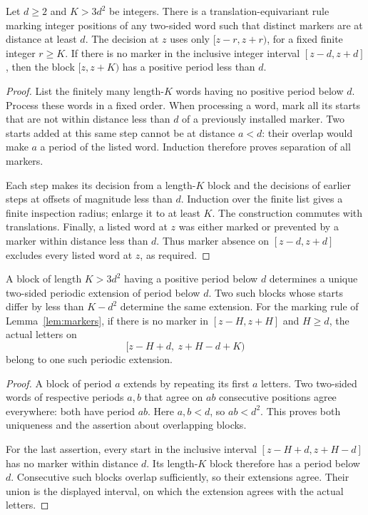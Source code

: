 \begin{lemma}\label{lem:markers}
Let $d\geq 2$ and $K>3d^2$ be integers.  There is a
translation-equivariant rule marking integer positions of any two-sided
word such that distinct markers are at distance at least $d$.
The decision at $z$ uses only $[z-r,z+r)$, for a fixed finite integer
$r\geq K$.  If there is no marker in the inclusive integer interval
$[z-d,z+d]$, then the block $[z,z+K)$ has a positive period less than $d$.
\end{lemma}

\begin{proof}
List the finitely many length-$K$ words having no positive period below
$d$.  Process these words in a fixed order.  When processing a word,
mark all its starts that are not within distance less than $d$ of a
previously installed marker.  Two starts added at this same step cannot
be at distance $a<d$: their overlap would make $a$ a period of the
listed word.  Induction therefore proves separation of all markers.

Each step makes its decision from a length-$K$ block and the decisions
of earlier steps at offsets of magnitude less than $d$.  Induction over
the finite list gives a finite inspection radius; enlarge it to at
least $K$.  The construction commutes with translations.  Finally, a
listed word at $z$ was either marked or prevented by a marker within
distance less than $d$.  Thus marker absence on $[z-d,z+d]$ excludes
every listed word at $z$, as required.
\end{proof}

\begin{lemma}\label{lem:periodic-extension}
A block of length $K>3d^2$ having a positive period below $d$ determines
a unique two-sided periodic extension of period below $d$.  Two such
blocks whose starts differ by less than $K-d^2$ determine the same
extension.  For the marking rule of Lemma~\ref{lem:markers}, if there is
no marker in $[z-H,z+H]$ and $H\geq d$, the actual letters on
\[
       [z-H+d,\ z+H-d+K)
\]
belong to one such periodic extension.
\end{lemma}

\begin{proof}
A block of period $a$ extends by repeating its first $a$ letters.  Two
two-sided words of respective periods $a,b$ that agree on $ab$
consecutive positions agree everywhere: both have period $ab$.
Here $a,b<d$, so $ab<d^2$.  This proves both uniqueness and the assertion
about overlapping blocks.

For the last assertion, every start in the inclusive interval
$[z-H+d,z+H-d]$ has no marker within distance $d$.  Its length-$K$ block
therefore has a period below $d$.  Consecutive such blocks overlap
sufficiently, so their extensions agree.  Their union is the displayed
interval, on which the extension agrees with the actual letters.
\end{proof}

